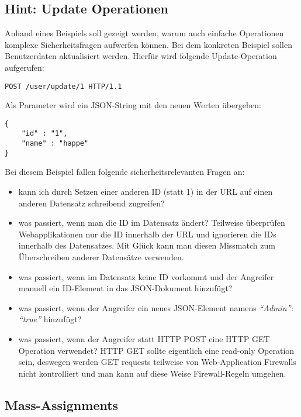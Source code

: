 \subsection{Hint: Update Operationen}

Anhand eines Beispiels soll gezeigt werden, warum auch einfache Operationen komplexe Sicherheitsfragen aufwerfen können. Bei dem konkreten Beispiel sollen Benutzerdaten aktualisiert werden. Hierfür wird folgende Update-Operation aufgerufen:

\begin{verbatim}
POST /user/update/1 HTTP/1.1
\end{verbatim}

Als Parameter wird ein JSON-String mit den neuen Werten übergeben:

\begin{verbatim}
{
	"id" : "1",
	"name" : "happe"
}
\end{verbatim}

Bei diesem Beispiel fallen folgende sicherheitsrelevanten Fragen an:

\begin{itemize}
	\item kann ich durch Setzen einer anderen ID (statt 1) in der URL auf einen anderen Datensatz schreibend zugreifen?
	\item was passiert, wenn man die ID im Datensatz ändert? Teilweise überprüfen Webapplikationen nur die ID innerhalb der URL und ignorieren die IDs innerhalb des Datensatzes. Mit Glück kann man diesen Missmatch zum Überschreiben anderer Datensätze verwenden.
	\item was passiert, wenn im Datensatz keine ID vorkommt und der Angreifer manuell ein ID-Element in das JSON-Dokument hinzufügt?
	\item was passiert, wenn der Angreifer ein neues JSON-Element namens \textit{``Admin'': ``true''} hinzufügt?
	\item was passiert, wenn der Angreifer statt HTTP POST eine HTTP GET Operation verwendet? HTTP GET sollte eigentlich eine read-only Operation sein, deswegen werden GET requests teilweise von Web-Application Firewalls nicht kontrolliert und man kann auf diese Weise Firewall-Regeln umgehen.
\end{itemize}

\subsection{Mass-Assignments}

